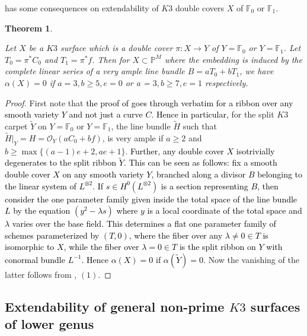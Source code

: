\documentclass[11pt,twoside]{amsart}
\theoremstyle{plain}
\numberwithin{equation}{section}
\newtheorem{theorem}{Theorem}[section]
\theoremstyle{definition}
\begin{document}
 has some consequences on extendability of $K3$ double covers $X$ of $\mathbb{F}_0$ or $\mathbb{F}_1$. 

\begin{theorem}\label{rank two}

Let $X$ be a $K3$ surface which is a double cover $\pi: X \to Y$ of $Y = \mathbb{F}_0$ or $Y = \mathbb{F}_1$. Let $T_0 = \pi^*C_0$ and $T_1 = \pi^*f$. Then for $X \subset \mathbb{P}^M$ where the embedding is induced by the complete linear series of a very ample line bundle $B = aT_0+bT_1$, we have $\alpha(X) = 0$ if $a = 3, b \geq 5, e = 0$ or a = $3, b \geq 7, e = 1$ respectively.

\end{theorem}

\begin{proof}
    First note that \textcolor{black}{the proof of } \cite[Proposition $2.1$]{DM24} \textcolor{black}{goes through verbatim for a ribbon over any smooth variety $Y$ and not just a curve $C$}. \textcolor{black}{Hence in particular,} for the split $K3$ carpet $\widetilde{Y}$ on $Y = \mathbb{F}_0$ or $Y = \mathbb{F}_1$, the line bundle $\widetilde{H}$ such that $\widetilde{H}|_Y = H = \mathcal{O}_Y(aC_0+bf)$, is very ample if $a \geq 2$ and $b \geq \max\{(a-1)e+2, ae+1\}$. 
    \textcolor{black}{Further, any double cover $X$ isotrivially degenerates to the split ribbon $\widetilde{Y}$. This can be seen as follows: fix a smooth double cover $X$ on any smooth variety $Y$, branched along a divisor $B$ belonging to the linear system of $L^{\otimes 2}$. If  $s \in H^0(L^{\otimes 2})$ is a section representing $B$, then consider the one parameter family given inside the total space of the line bundle $L$ by the equation  $(y^2-\lambda s)$ where $y$ is a local coordinate of the total space and $\lambda$ varies over the base field. This determines a flat one parameter family of schemes parameterized by $(T,0)$, where the fiber over any $\lambda \neq 0 \in T$ is isomorphic to $X$, while the fiber over $\lambda = 0 \in T$ is the split ribbon on $Y$ with conormal bundle $L^{-1}$. Hence $\alpha(X) = 0$ if $\alpha(\widetilde{Y}) = 0$. }
    Now the vanishing of the latter follows from , $(1)$.
\end{proof}



\subsection{Extendability of general non-prime $K3$ surfaces of lower genus}
\end{document}
